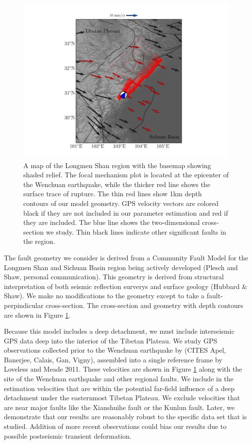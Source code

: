 \documentclass{article}
\begin{document}
\begin{figure}[h!]
    \centering
    \includegraphics[width=7in]{figs/lms_map_with_faults.pdf}
    \caption{A map of the Longmen Shan region with the basemap showing shaded relief. The focal mechanism plot is located at the epicenter of the Wenchuan earthquake, while the thicker red line shows the surface trace of rupture. The thin red lines show 1km depth contours of our model geometry. GPS velocity vectors are colored black if they are not included in our parameter estimation and red if they are included. The blue line shows the two-dimensional cross-section we study. Thin black lines indicate other significant faults in the region.}
    \label{fig:regional_map}
\end{figure}

The fault geometry we consider is derived from a Community Fault Model for the Longmen Shan and Sichuan Basin region being actively developed (Plesch and Shaw, personal communication).  This geometry is derived from structural interpretation of both seismic reflection surverys and surface geology (Hubbard \& Shaw).  We make no modifications to the geometry except to take a fault-perpindicular cross-section.  The cross-section and geometry with depth contours are shown in Figure \ref{fig:regional_map}.

Because this model includes a deep detachment, we must include interseismic GPS data deep into the interior of the Tibetan Plateau. We study GPS observations collected prior to the Wenchuan earthquake by (CITES Apel, Banerjee, Calais, Gan, Vigny), assembled into a single reference frame by Loveless and Meade 2011. These velocities are shown in Figure \ref{fig:regional_map} along with the site of the Wenchuan earthquake and other regional faults. We include in the estimation velocities that are within the potential far-field influence of a deep detachment under the easternmost Tibetan Plateau. We exclude velocities that are near major faults like the Xianshuihe fault or the Kunlun fault. Later, we demonstrate that our results are reasonably robust to the specific data set that is studied. Addition of more recent observations could bias our results due to possible postseismic transient deformation.
\end{document}
